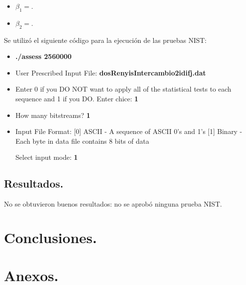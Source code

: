 \documentclass[10pt]{IEEEtran}
\begin{document}
\begin{itemize}
\item $\beta_{1}=$.
\item $\beta_{2}=$.
\end{itemize}




Se utilizó el siguiente código para la ejecución de las pruebas NIST:


\begin{itemize}
\item \textbf{./assess 2560000}
\item User Prescribed Input File: \textbf{dosRenyisIntercambio2idifj.dat}
\item    Enter 0 if you DO NOT want to apply all of the
         statistical tests to each sequence and 1 if you DO. Enter chice: \textbf{1}
                  
\item  How many bitstreams? \textbf{1}

\item Input File Format:
    [0] ASCII - A sequence of ASCII 0's and 1's
    [1] Binary - Each byte in data file contains 8 bits of data

   Select input mode:  \textbf{1}
\end{itemize}





\subsection{Resultados.}

No se obtuvieron buenos resultados: no se aprobó ninguna prueba NIST.


 

\section{Conclusiones.}



\onecolumn
\section{Anexos.}
\end{document}
